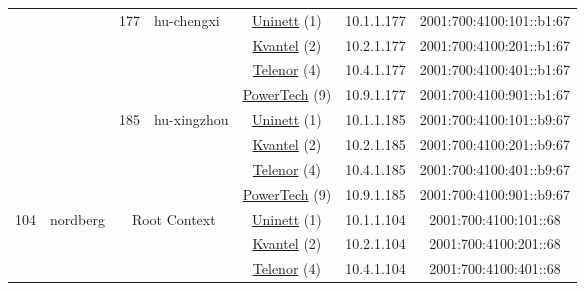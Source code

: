 \begin{small}
\begin{center}
\begin{longtable}{|c|c|c|c|c|c|c|c|}
  &  & \multirow{4}{*}{\tiny{177}} & \multicolumn{1}{|l|}{\multirow{4}{*}{\tiny{hu-chengxi}}} & \multicolumn{2}{|c|}{\tiny{\href{https://www.uninett.no}{Uninett} (1)}} & \tiny{10.1.1.177} & \tiny{2001:700:4100:101::b1:67} \\* \cline{5-5}\cline{6-6}\cline{7-7}\cline{8-8}
  &  &  &  & \multicolumn{2}{|c|}{\tiny{\href{http://kvantel.no}{Kvantel} (2)}} & \tiny{10.2.1.177} & \tiny{2001:700:4100:201::b1:67} \\* \cline{5-5}\cline{6-6}\cline{7-7}\cline{8-8}
  &  &  &  & \multicolumn{2}{|c|}{\tiny{\href{https://www.telenor.no}{Telenor} (4)}} & \tiny{10.4.1.177} & \tiny{2001:700:4100:401::b1:67} \\* \cline{5-5}\cline{6-6}\cline{7-7}\cline{8-8}
  &  &  &  & \multicolumn{2}{|c|}{\tiny{\href{http://www.powertech.no}{PowerTech} (9)}} & \tiny{10.9.1.177} & \tiny{2001:700:4100:901::b1:67} \\* \cline{3-3}\cline{4-4}\cline{5-5}\cline{6-6}\cline{7-7}\cline{8-8}
  &  & \multirow{4}{*}{\tiny{185}} & \multicolumn{1}{|l|}{\multirow{4}{*}{\tiny{hu-xingzhou}}} & \multicolumn{2}{|c|}{\tiny{\href{https://www.uninett.no}{Uninett} (1)}} & \tiny{10.1.1.185} & \tiny{2001:700:4100:101::b9:67} \\* \cline{5-5}\cline{6-6}\cline{7-7}\cline{8-8}
  &  &  &  & \multicolumn{2}{|c|}{\tiny{\href{http://kvantel.no}{Kvantel} (2)}} & \tiny{10.2.1.185} & \tiny{2001:700:4100:201::b9:67} \\* \cline{5-5}\cline{6-6}\cline{7-7}\cline{8-8}
  &  &  &  & \multicolumn{2}{|c|}{\tiny{\href{https://www.telenor.no}{Telenor} (4)}} & \tiny{10.4.1.185} & \tiny{2001:700:4100:401::b9:67} \\* \cline{5-5}\cline{6-6}\cline{7-7}\cline{8-8}
  &  &  &  & \multicolumn{2}{|c|}{\tiny{\href{http://www.powertech.no}{PowerTech} (9)}} & \tiny{10.9.1.185} & \tiny{2001:700:4100:901::b9:67} \\ \hline
 \multirow{32}{*}{\tiny{104}} & \multicolumn{1}{|l|}{\multirow{32}{*}{\tiny{nordberg}}} & \multicolumn{2}{|c|}{\multirow{4}{*}{\tiny{Root Context}}} & \multicolumn{2}{|c|}{\tiny{\href{https://www.uninett.no}{Uninett} (1)}} & \tiny{10.1.1.104} & \tiny{2001:700:4100:101::68} \\* \cline{5-5}\cline{6-6}\cline{7-7}\cline{8-8}
  &  & \multicolumn{2}{|c|}{} & \multicolumn{2}{|c|}{\tiny{\href{http://kvantel.no}{Kvantel} (2)}} & \tiny{10.2.1.104} & \tiny{2001:700:4100:201::68} \\* \cline{5-5}\cline{6-6}\cline{7-7}\cline{8-8}
  &  & \multicolumn{2}{|c|}{} & \multicolumn{2}{|c|}{\tiny{\href{https://www.telenor.no}{Telenor} (4)}} & \tiny{10.4.1.104} & \tiny{2001:700:4100:401::68} \\* \cline{5-5}\cline{6-6}\cline{7-7}\cline{8-8}

\end{longtable}
\end{center}
\end{small}
